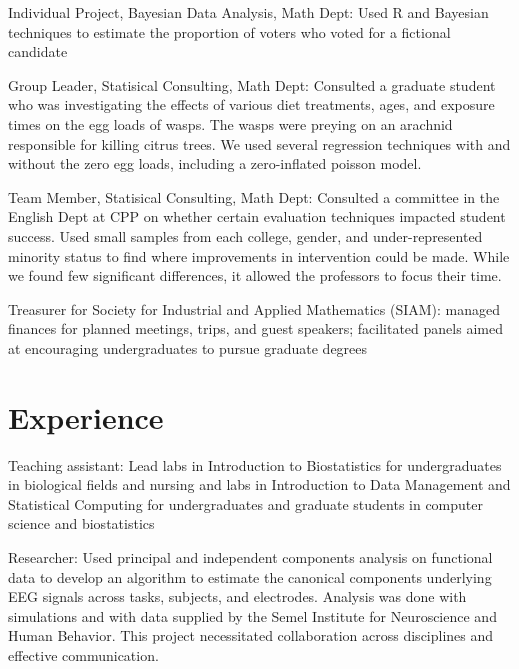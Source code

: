 \documentclass[]{deedy-resume-openfont}
\begin{document}
\vspace{-.25em}
\begin{tightemize}
\item Individual Project, Bayesian Data Analysis, Math Dept: Used R and Bayesian techniques to estimate the proportion of voters who voted for a fictional candidate
\item Group Leader, Statisical Consulting, Math Dept: Consulted a graduate student who was investigating the effects of various diet treatments, ages, and exposure times on the egg loads of wasps. The wasps were preying on an arachnid responsible for killing citrus trees. We used several regression techniques with and without the zero egg loads, including a zero-inflated poisson model.
\item Team Member, Statisical Consulting, Math Dept: Consulted a committee in the English Dept at CPP on whether certain evaluation techniques impacted student success. Used small samples from each college, gender, and under-represented minority status to find where improvements in intervention could be made. While we found few significant differences, it allowed the professors to focus their time.
\item Treasurer for Society for Industrial and Applied Mathematics (SIAM): managed finances for planned meetings, trips, and guest speakers; facilitated panels aimed at encouraging undergraduates to pursue graduate degrees
\end{tightemize}
\sectionsep

\section{Experience}

\vspace{-.25em} %
\begin{tightemize}
\item Teaching assistant: Lead labs in Introduction to Biostatistics for undergraduates in biological fields and nursing and labs in Introduction to Data Management and Statistical Computing for undergraduates and graduate students in computer science and biostatistics 
\item Researcher: Used principal and independent components analysis on functional data to develop an algorithm to estimate the canonical components underlying EEG signals across tasks, subjects, and electrodes. Analysis was done with simulations and with data supplied by the Semel Institute for Neuroscience and Human Behavior. This project necessitated collaboration across disciplines and effective communication. 
\end{tightemize}
\sectionsep
\end{document}
